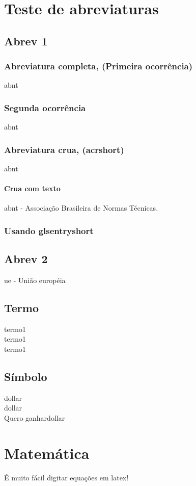 \documentclass[12pt,a4paper,oneside,brazil]{abntex2}
\begin{document}
\chapter{Teste de abreviaturas}
\section{Abrev 1}
\subsection{Abreviatura completa, (Primeira ocorrência)}
\gls{abnt}
\subsection{Segunda ocorrência}
\gls{abnt}
\subsection{Abreviatura crua, (acrshort)}
\acrshort{abnt}
\subsubsection{Crua com texto}
\acrshort{abnt} - Associação Brasileira de Normas Técnicas.
\subsection{Usando glsentryshort}

\section{Abrev 2}
\gls{ue} - União européia

\section{Termo}
\gls{termo1}\\
\gls{termo1}\\
\acrshort{termo1}

\section{Símbolo}
\gls{dollar}\\
\gls{dollar} \\
Quero ganhar\acrshort{dollar}

\chapter{Matemática}
É muito fácil digitar equações em latex!\\
\lipsum[1][1-12]
\end{document}
